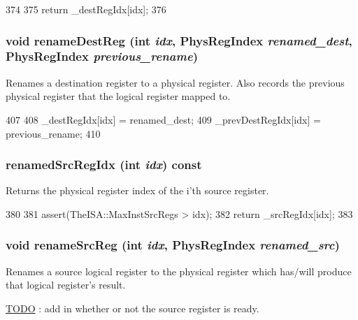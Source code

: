 \begin{DoxyCode}
374     {
375         return _destRegIdx[idx];
376     }
\end{DoxyCode}
\hypertarget{classBaseDynInst_a9ae02d3c598d15a5c835ab7d4e647ce1}{
\subsubsection[{renameDestReg}]{\setlength{\rightskip}{0pt plus 5cm}void renameDestReg (int {\em idx}, \/  {\bf PhysRegIndex} {\em renamed\_\-dest}, \/  {\bf PhysRegIndex} {\em previous\_\-rename})}}
\label{classBaseDynInst_a9ae02d3c598d15a5c835ab7d4e647ce1}
Renames a destination register to a physical register. Also records the previous physical register that the logical register mapped to. 


\begin{DoxyCode}
407     {
408         _destRegIdx[idx] = renamed_dest;
409         _prevDestRegIdx[idx] = previous_rename;
410     }
\end{DoxyCode}
\hypertarget{classBaseDynInst_a77110024c396fae8eb7cc90446c05100}{
\subsubsection[{renamedSrcRegIdx}]{ renamedSrcRegIdx (int {\em idx}) const}}
\label{classBaseDynInst_a77110024c396fae8eb7cc90446c05100}
Returns the physical register index of the i'th source register. 


\begin{DoxyCode}
380     {
381         assert(TheISA::MaxInstSrcRegs > idx);
382         return _srcRegIdx[idx];
383     }
\end{DoxyCode}
\hypertarget{classBaseDynInst_af3d4e52aa8ea0b526cd9f78f67127f36}{
\subsubsection[{renameSrcReg}]{\setlength{\rightskip}{0pt plus 5cm}void renameSrcReg (int {\em idx}, \/  {\bf PhysRegIndex} {\em renamed\_\-src})}}
\label{classBaseDynInst_af3d4e52aa8ea0b526cd9f78f67127f36}
Renames a source logical register to the physical register which has/will produce that logical register's result. \begin{Desc}
\item[\hyperlink{todo__todo000014}{TODO}]: add in whether or not the source register is ready. \end{Desc}



